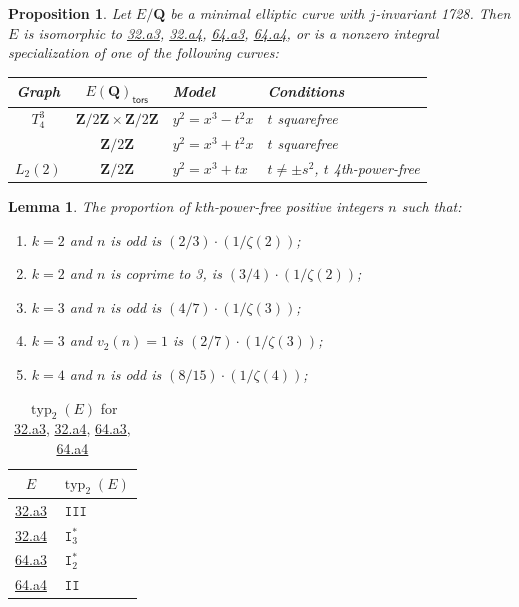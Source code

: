 \documentclass[10pt,a4paper]{amsart}
\newtheorem{prop}{Proposition}
\newtheorem{lem}{Lemma}
\DeclareMathOperator{\I}{\mathtt{I}}
\DeclareMathOperator{\II}{\mathtt{II}}
\DeclareMathOperator{\III}{\mathtt{III}}
\newcommand{\Q}{\mathbf{Q}}
\newcommand{\Z}{\mathbf{Z}}
\newcommand{\tors}{\mathsf{tors}}
\DeclareMathOperator{\typ}{{typ}}
\begin{document}
\begin{prop} \label{1728_minimal_models}
Let $E/\Q$ be a minimal elliptic curve with $j$-invariant 1728.  Then $E$ is isomorphic to \href{https://beta.lmfdb.org/EllipticCurve/Q/32/a/3}{32.a3}, \href{https://beta.lmfdb.org/EllipticCurve/Q/32/a/4}{32.a4},  \href{https://beta.lmfdb.org/EllipticCurve/Q/64/a/3}{64.a3}, \href{https://beta.lmfdb.org/EllipticCurve/Q/64/a/4}{64.a4}, or is a nonzero integral specialization of one of the following curves:
\begin{center}
\begin{tabular}{|c|c|l|l|}
\hline
Graph & $E(\Q)_\tors$ & Model &  Conditions\\
\hline
$T_4^3$ & $\Z/2\Z \times \Z/2\Z$ & $y^2 = x^3-t^2x$ & $t$ squarefree\\
& $\Z/2\Z$ &$y^2 = x^3+t^2x$ & $t$ squarefree \\
\hline
$L_2(2)$ & $\Z/2\Z$ & $y^2 = x^3 +tx$ & $t \ne \pm s^2$, $t$ 4th-power-free \\
\hline
\end{tabular}
\end{center}
\end{prop}

\begin{lem} \label{squarefree}
The proportion of $k$th-power-free positive integers $n$ such that:
\begin{enumerate}
\item $k=2$ and $n$ is odd is $(2/3) \cdot (1/\zeta(2))$; \label{odd_sqf}
\item $k=2$ and $n$ is coprime to 3, is $(3/4) \cdot (1/\zeta(2))$;
\item $k=3$ and $n$ is odd is $(4/7) \cdot (1/\zeta(3))$;
\item $k=3$ and $v_2(n)=1$ is $(2/7) \cdot (1/\zeta(3))$;
\item $k=4$ and $n$ is odd is $(8/15) \cdot (1/\zeta(4))$;
\end{enumerate} 
\end{lem}

\begin{center}
\begin{table}[h] 
\begin{tabular}{|cl|}
\hline
$E$ & $\typ_2(E)$ \\
\hline
\href{https://beta.lmfdb.org/EllipticCurve/Q/32/a/3}{32.a3} & $\III$  \\
\href{https://beta.lmfdb.org/EllipticCurve/Q/34/a/4}{32.a4} & $\I_3^*$ \\
\href{https://beta.lmfdb.org/EllipticCurve/Q/64/a/3}{64.a3} & $\I_2^*$ \\
\href{https://beta.lmfdb.org/EllipticCurve/Q/64/a/4}{64.a4} & $\II$ \\
\hline
\end{tabular}
\caption{$\typ_2(E)$ for \href{https://beta.lmfdb.org/EllipticCurve/Q/32/a/3}{32.a3},
\href{https://beta.lmfdb.org/EllipticCurve/Q/32/a/4}{32.a4}, 
\href{https://beta.lmfdb.org/EllipticCurve/Q/64/a/3}{64.a3}, 
\href{https://beta.lmfdb.org/EllipticCurve/Q/64/a/4}{64.a4}} \label{j1728_finite_tables}
\end{table} 
\end{center}
\end{document}
